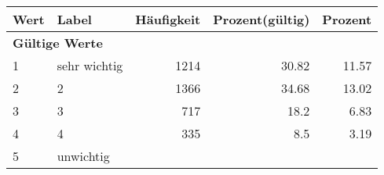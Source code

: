     \begin{longtable}{lXrrr}
     \toprule
     \textbf{Wert} & \textbf{Label} & \textbf{Häufigkeit} & \textbf{Prozent(gültig)} & \textbf{Prozent} \\
     \endhead
     \midrule
     \multicolumn{5}{l}{\textbf{Gültige Werte}}\\

     1 &
     \multicolumn{1}{X}{ sehr wichtig   } &


       \num{1214} &
       \num[round-mode=places,round-precision=2]{30,82} &
         \num[round-mode=places,round-precision=2]{11,57} \\

     2 &
     \multicolumn{1}{X}{ 2   } &


       \num{1366} &
       \num[round-mode=places,round-precision=2]{34,68} &
         \num[round-mode=places,round-precision=2]{13,02} \\

     3 &
     \multicolumn{1}{X}{ 3   } &


       \num{717} &
       \num[round-mode=places,round-precision=2]{18,2} &
         \num[round-mode=places,round-precision=2]{6,83} \\

     4 &
     \multicolumn{1}{X}{ 4   } &


       \num{335} &
       \num[round-mode=places,round-precision=2]{8,5} &
         \num[round-mode=places,round-precision=2]{3,19} \\

     5 &
     \multicolumn{1}{X}{ unwichtig   } &



\end{longtable}
